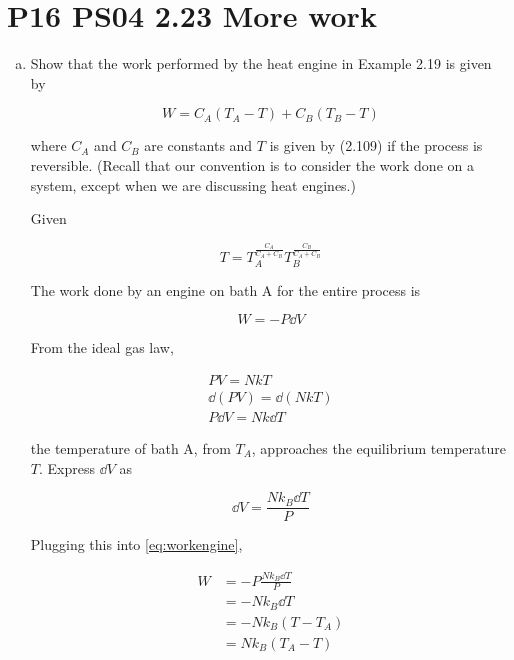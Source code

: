 \documentclass[9pt,a4paper,twocolumn]{article}
\begin{document}
\section{P16 PS04 2.23 More work}
\begin{enumerate}[(a)]

\item Show that the work performed by the heat engine in Example 2.19 is given by

\begin{equation}
	W = C_A \left( T_A - T \right) + C_B \left( T_B - T \right) \label{eq:prove}
\end{equation}

where $C_A$ and $C_B$ are constants and $T$ is given by (2.109) if the process is reversible. (Recall that our convention is to consider the work done on a system, except when we are discussing heat engines.)

Given

\begin{equation}\label{eq:giventemp}
	T = T_A^{\frac{C_A}{C_A + C_B}} T_B^{\frac{C_B}{C_A + C_B}}
\end{equation}

The work done by an engine on bath A for the entire process is

\begin{equation}\label{eq:workengine}
	W = -P\dd{V}
\end{equation}

From the ideal gas law,

\begin{align}
	PV = NkT \\
	\dd(PV) = \dd(NkT) \\
	P\dd{V} = Nk \dd{T} \label{eq:idealgas}
\end{align}

the temperature of bath A, from $T_A$, approaches the equilibrium temperature $T$. Express $\dd{V}$ as

\begin{equation}
	\dd{V} = \frac{Nk_B \dd{T}}{P}
\end{equation}

Plugging this into \eqref{eq:workengine},

\begin{align}
	W & = -P \frac{Nk_B\dd{T}}{P} \nonumber \\
	& = -Nk_B\dd{T} \nonumber \\
	& = -Nk_B \left( T - T_A \right) \nonumber \\
	& = Nk_B \left( T_A - T \right)
\end{align}


\end{enumerate}
\end{document}
